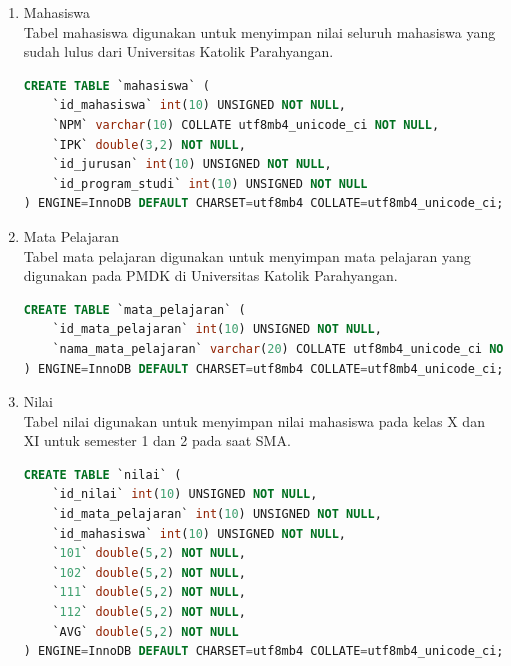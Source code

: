 \begin{enumerate}
\begin{lstlisting}[language=SQL, caption=Implementasi tabel ]
    \end{lstlisting}
    
    \item Mahasiswa\\
    Tabel mahasiswa digunakan untuk menyimpan nilai seluruh mahasiswa yang sudah lulus dari Universitas Katolik Parahyangan.
    
    \begin{lstlisting}[language=SQL, caption=Implementasi tabel ]
CREATE TABLE `mahasiswa` (
    `id_mahasiswa` int(10) UNSIGNED NOT NULL,
    `NPM` varchar(10) COLLATE utf8mb4_unicode_ci NOT NULL,
    `IPK` double(3,2) NOT NULL,
    `id_jurusan` int(10) UNSIGNED NOT NULL,
    `id_program_studi` int(10) UNSIGNED NOT NULL
) ENGINE=InnoDB DEFAULT CHARSET=utf8mb4 COLLATE=utf8mb4_unicode_ci;    
    \end{lstlisting}
    
    \item Mata Pelajaran\\
    Tabel mata pelajaran digunakan untuk menyimpan mata pelajaran yang digunakan pada PMDK di Universitas Katolik Parahyangan.
    
    \begin{lstlisting}[language=SQL, caption=Implementasi tabel ]
CREATE TABLE `mata_pelajaran` (
    `id_mata_pelajaran` int(10) UNSIGNED NOT NULL,
    `nama_mata_pelajaran` varchar(20) COLLATE utf8mb4_unicode_ci NOT NULL
) ENGINE=InnoDB DEFAULT CHARSET=utf8mb4 COLLATE=utf8mb4_unicode_ci;

    \end{lstlisting}
    
    \item Nilai\\
    Tabel nilai digunakan untuk menyimpan nilai mahasiswa pada kelas X dan XI untuk semester 1 dan 2 pada saat SMA.
    
    \begin{lstlisting}[language=SQL, caption=Implementasi tabel ]
CREATE TABLE `nilai` (
    `id_nilai` int(10) UNSIGNED NOT NULL,
    `id_mata_pelajaran` int(10) UNSIGNED NOT NULL,
    `id_mahasiswa` int(10) UNSIGNED NOT NULL,
    `101` double(5,2) NOT NULL,
    `102` double(5,2) NOT NULL,
    `111` double(5,2) NOT NULL,
    `112` double(5,2) NOT NULL,
    `AVG` double(5,2) NOT NULL
) ENGINE=InnoDB DEFAULT CHARSET=utf8mb4 COLLATE=utf8mb4_unicode_ci;
    \end{lstlisting}
    
\end{enumerate}

